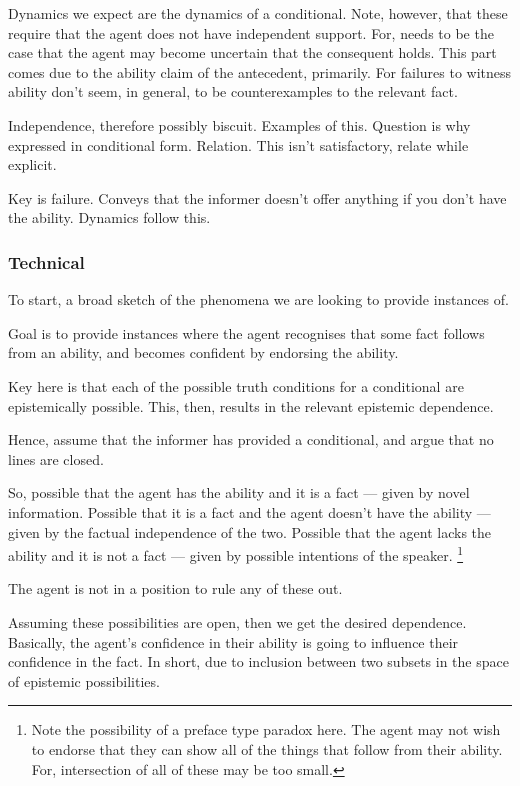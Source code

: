 \documentclass[10pt]{article}
\begin{document}
Dynamics we expect are the dynamics of a conditional.
Note, however, that these require that the agent does not have independent support.
For, needs to be the case that the agent may become uncertain that the consequent holds.
This part comes due to the ability claim of the antecedent, primarily.
For failures to witness ability don't seem, in general, to be counterexamples to the relevant fact.

Independence, therefore possibly biscuit.
Examples of this.
Question is why expressed in conditional form.
Relation.
This isn't satisfactory, relate while explicit.

Key is failure.
Conveys that the informer doesn't offer anything if you don't have the ability.
Dynamics follow this.

\subsubsection{Technical}
\label{sec:technical}

To start, a broad sketch of the phenomena we are looking to provide instances of.

Goal is to provide instances where the agent recognises that some fact follows from an ability, and becomes confident by endorsing the ability.

Key here is that each of the possible truth conditions for a conditional are epistemically possible.
This, then, results in the relevant epistemic dependence.

Hence, assume that the informer has provided a conditional, and argue that no lines are closed.

So, possible that the agent has the ability and it is a fact --- given by novel information.
Possible that it is a fact and the agent doesn't have the ability --- given by the factual independence of the two.
Possible that the agent lacks the ability and it is not a fact --- given by possible intentions of the speaker.\nolinebreak
\footnote{
  Note the possibility of a preface type paradox here.
  The agent may not wish to endorse that they can show all of the things that follow from their ability.
  For, intersection of all of these may be too small.
}

The agent is not in a position to rule any of these out.

Assuming these possibilities are open, then we get the desired dependence.
Basically, the agent's confidence in their ability is going to influence their confidence in the fact.
In short, due to inclusion between two subsets in the space of epistemic possibilities.
\end{document}
